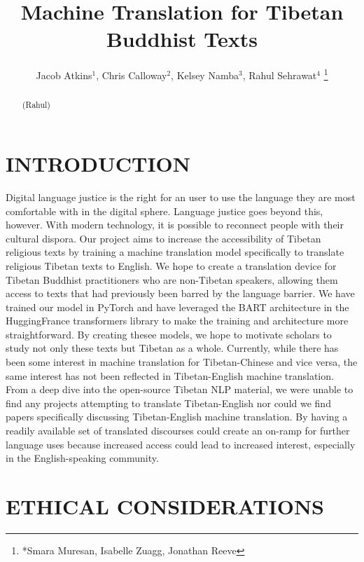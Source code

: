 \documentclass[letterpaper, 10 pt, conference]{ieeeconf}  %
\title{\LARGE \bf
Machine Translation for Tibetan Buddhist Texts
}
\author{ Jacob Atkins$^{1}$, Chris Calloway$^{2}$, Kelsey Namba$^{3}$, Rahul Sehrawat$^{4}$%
\thanks{*Smara Muresan, Isabelle Zuagg, Jonathan Reeve}%

}
\begin{document}
\maketitle
\thispagestyle{empty}
\pagestyle{empty}


\begin{abstract}

(Rahul)

\end{abstract}


\section{INTRODUCTION}

Digital language justice is the right for an user to use the language they are most comfortable with in the digital sphere. Language justice goes beyond this, however. With modern technology, it is possible to reconnect people with their cultural dispora. Our project aims to increase the accessibility of Tibetan religious texts by training a machine translation model specifically to translate religious Tibetan texts to English. We hope to create a translation device for Tibetan Buddhist practitioners who are non-Tibetan speakers, allowing them access to texts that had previously been barred by the language barrier. We have trained our model in PyTorch and have leveraged the BART architecture in the HuggingFrance transformers library to make the training and architecture more straightforward. By creating thesee models, we hope to motivate scholars to study not only these texts but Tibetan as a whole. Currently, while there has been some interest in machine translation for Tibetan-Chinese and vice versa, the same interest has not been reflected in Tibetan-English machine translation. From a deep dive into the open-source Tibetan NLP material, we were unable to find any projects attempting to translate Tibetan-English nor could we find papers specifically discussing Tibetan-English machine translation. By having a readily available set of translated discourses could create an on-ramp for further language uses because increased access could lead to increased interest, especially in the English-speaking community. 


\section{ETHICAL CONSIDERATIONS}
\end{document}
